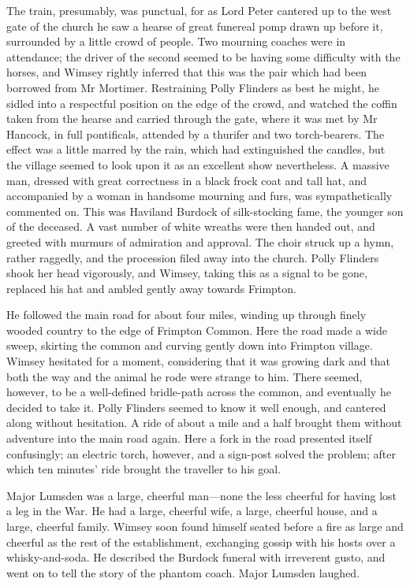 The train, presumably, was punctual, for as Lord Peter cantered up to the west gate of the church he saw a hearse of great funereal pomp drawn up before it, surrounded by a little crowd of people. Two mourning coaches were in attendance; the driver of the second seemed to be having some difficulty with the horses, and Wimsey rightly inferred that this was the pair which had been borrowed from Mr Mortimer. Restraining Polly Flinders as best he might, he sidled into a respectful position on the edge of the crowd, and watched the coffin taken from the hearse and carried through the gate, where it was met by Mr Hancock, in full pontificals, attended by a thurifer and two torch-bearers. The effect was a little marred by the rain, which had extinguished the candles, but the village seemed to look upon it as an excellent show nevertheless. A massive man, dressed with great correctness in a black frock coat and tall hat, and accompanied by a woman in handsome mourning and furs, was sympathetically commented on. This was Haviland Burdock of silk-stocking fame, the younger son of the deceased. A vast number of white wreaths were then handed out, and greeted with murmurs of admiration and approval. The choir struck up a hymn, rather raggedly, and the procession filed away into the church. Polly Flinders shook her head vigorously, and Wimsey, taking this as a signal to be gone, replaced his hat and ambled gently away towards Frimpton.

He followed the main road for about four miles, winding up through finely wooded country to the edge of Frimpton Common. Here the road made a wide sweep, skirting the common and curving gently down into Frimpton village. Wimsey hesitated for a moment, considering that it was growing dark and that both the way and the animal he rode were strange to him. There seemed, however, to be a well-defined bridle-path across the common, and eventually he decided to take it. Polly Flinders seemed to know it well enough, and cantered along without hesitation. A ride of about a mile and a half brought them without adventure into the main road again. Here a fork in the road presented itself confusingly; an electric torch, however, and a sign-post solved the problem; after which ten minutes' ride brought the traveller to his goal.

Major Lumsden was a large, cheerful man—none the less cheerful for having lost a leg in the War. He had a large, cheerful wife, a large, cheerful house, and a large, cheerful family. Wimsey soon found himself seated before a fire as large and cheerful as the rest of the establishment, exchanging gossip with his hosts over a whisky-and-soda. He described the Burdock funeral with irreverent gusto, and went on to tell the story of the phantom coach. Major Lumsden laughed.

